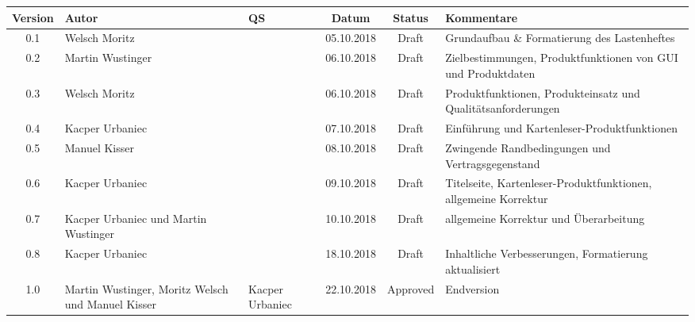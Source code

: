 \documentclass[minted, notitle]{protocol}
\newcommand{\draft}{\cellcolor{Peach} Draft}
\newcommand{\abgabe}{\cellcolor{LimeGreen}Approved }
\begin{document}
\begin{center}

\begin{tabular}{| c | p{1.8cm} | p{1.8cm} | c | c | p{3.4cm} |}
\hline \rowcolor{gray} \textbf{\color{white}Version} & \textbf{\color{white}Autor} & \textbf{\color{white}QS} & \textbf{\color{white}Datum} & \textbf{\color{white}Status} & \textbf{\color{white}Kommentare} \\ 
 \hline \hline
 0.1 & Welsch Moritz && 05.10.2018 & \draft & Grundaufbau \& Formatierung des Lastenheftes\\
 \hline  
 0.2 & Martin Wustinger && 06.10.2018 & \draft& Zielbestimmungen, Produktfunktionen von GUI und Produktdaten \\
 \hline    
  0.3 & Welsch Moritz && 06.10.2018 & \draft & Produktfunktionen, Produkteinsatz und Qualitätsanforderungen \\
 \hline 
 0.4 & Kacper Urbaniec && 07.10.2018 & \draft & Einführung und Kartenleser-Produktfunktionen  \\
 \hline
 0.5 & Manuel Kisser && 08.10.2018 & \draft & Zwingende Randbedingungen und Vertragsgegenstand  \\
 \hline
  0.6 & Kacper Urbaniec && 09.10.2018 & \draft & Titelseite, Kartenleser-Produktfunktionen, allgemeine Korrektur  \\
 \hline
  0.7 & Kacper Urbaniec und Martin Wustinger && 10.10.2018 & \draft & allgemeine Korrektur und Überarbeitung \\
 \hline
 0.8 & Kacper Urbaniec && 18.10.2018 & \draft & Inhaltliche Verbesserungen, Formatierung aktualisiert \\ 
 \hline
 1.0 & Martin Wustinger, Moritz Welsch und Manuel Kisser & Kacper Urbaniec& 22.10.2018& \abgabe &Endversion\\
 \hline
\end{tabular}
\end{center}

\clearpage
{ %
  \hypersetup{linkcolor=black}
  \tableofcontents
} 
\clearpage

\end{document}
